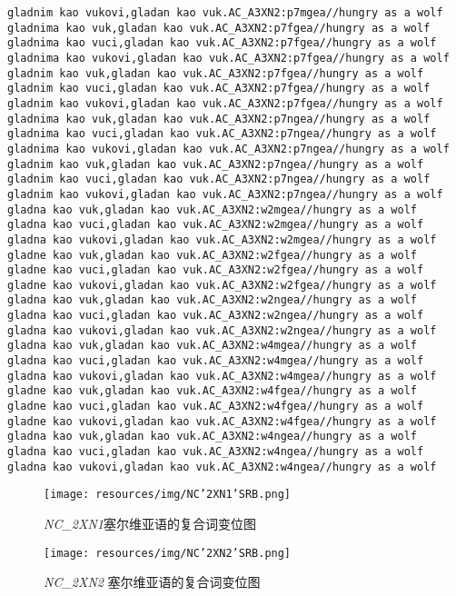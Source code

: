 \begin{verbatim}
gladnim kao vukovi,gladan kao vuk.AC_A3XN2:p7mgea//hungry as a wolf
gladnima kao vuk,gladan kao vuk.AC_A3XN2:p7fgea//hungry as a wolf
gladnima kao vuci,gladan kao vuk.AC_A3XN2:p7fgea//hungry as a wolf
gladnima kao vukovi,gladan kao vuk.AC_A3XN2:p7fgea//hungry as a wolf
gladnim kao vuk,gladan kao vuk.AC_A3XN2:p7fgea//hungry as a wolf
gladnim kao vuci,gladan kao vuk.AC_A3XN2:p7fgea//hungry as a wolf
gladnim kao vukovi,gladan kao vuk.AC_A3XN2:p7fgea//hungry as a wolf
gladnima kao vuk,gladan kao vuk.AC_A3XN2:p7ngea//hungry as a wolf
gladnima kao vuci,gladan kao vuk.AC_A3XN2:p7ngea//hungry as a wolf
gladnima kao vukovi,gladan kao vuk.AC_A3XN2:p7ngea//hungry as a wolf
gladnim kao vuk,gladan kao vuk.AC_A3XN2:p7ngea//hungry as a wolf
gladnim kao vuci,gladan kao vuk.AC_A3XN2:p7ngea//hungry as a wolf
gladnim kao vukovi,gladan kao vuk.AC_A3XN2:p7ngea//hungry as a wolf
gladna kao vuk,gladan kao vuk.AC_A3XN2:w2mgea//hungry as a wolf
gladna kao vuci,gladan kao vuk.AC_A3XN2:w2mgea//hungry as a wolf
gladna kao vukovi,gladan kao vuk.AC_A3XN2:w2mgea//hungry as a wolf
gladne kao vuk,gladan kao vuk.AC_A3XN2:w2fgea//hungry as a wolf
gladne kao vuci,gladan kao vuk.AC_A3XN2:w2fgea//hungry as a wolf
gladne kao vukovi,gladan kao vuk.AC_A3XN2:w2fgea//hungry as a wolf
gladna kao vuk,gladan kao vuk.AC_A3XN2:w2ngea//hungry as a wolf
gladna kao vuci,gladan kao vuk.AC_A3XN2:w2ngea//hungry as a wolf
gladna kao vukovi,gladan kao vuk.AC_A3XN2:w2ngea//hungry as a wolf
gladna kao vuk,gladan kao vuk.AC_A3XN2:w4mgea//hungry as a wolf
gladna kao vuci,gladan kao vuk.AC_A3XN2:w4mgea//hungry as a wolf
gladna kao vukovi,gladan kao vuk.AC_A3XN2:w4mgea//hungry as a wolf
gladne kao vuk,gladan kao vuk.AC_A3XN2:w4fgea//hungry as a wolf
gladne kao vuci,gladan kao vuk.AC_A3XN2:w4fgea//hungry as a wolf
gladne kao vukovi,gladan kao vuk.AC_A3XN2:w4fgea//hungry as a wolf
gladna kao vuk,gladan kao vuk.AC_A3XN2:w4ngea//hungry as a wolf
gladna kao vuci,gladan kao vuk.AC_A3XN2:w4ngea//hungry as a wolf
gladna kao vukovi,gladan kao vuk.AC_A3XN2:w4ngea//hungry as a wolf
\end{verbatim}
\normalsize

\begin{figure}[!htb]
  \centering
  \texttt{[image: resources/img/NC'2XN1'SRB.png]}
  \caption{\emph{NC\_2XN1}塞尔维亚语的复合词变位图}
  \label{fig:NC'2XN1'SRB}
\end{figure}

\begin{figure}[!htb]
  \centering
  \texttt{[image: resources/img/NC'2XN2'SRB.png]}
  \caption{\emph{NC\_2XN2} 塞尔维亚语的复合词变位图}
  \label{fig:NC'2XN2'SRB}
\end{figure}

